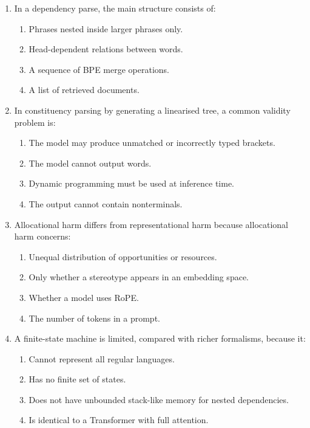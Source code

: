 \documentclass[11pt,a4paper]{article}
\begin{document}
\begin{enumerate}[leftmargin=*]
\begin{enumerate}
\item In a dependency parse, the main structure consists of:
\begin{enumerate}[label=\Alph*.]
\item Phrases nested inside larger phrases only.
\item Head-dependent relations between words.
\item A sequence of BPE merge operations.
\item A list of retrieved documents.
\end{enumerate}

\item In constituency parsing by generating a linearised tree, a common validity problem is:
\begin{enumerate}[label=\Alph*.]
\item The model may produce unmatched or incorrectly typed brackets.
\item The model cannot output words.
\item Dynamic programming must be used at inference time.
\item The output cannot contain nonterminals.
\end{enumerate}

\item Allocational harm differs from representational harm because allocational harm concerns:
\begin{enumerate}[label=\Alph*.]
\item Unequal distribution of opportunities or resources.
\item Only whether a stereotype appears in an embedding space.
\item Whether a model uses RoPE.
\item The number of tokens in a prompt.
\end{enumerate}

\item A finite-state machine is limited, compared with richer formalisms, because it:
\begin{enumerate}[label=\Alph*.]
\item Cannot represent all regular languages.
\item Has no finite set of states.
\item Does not have unbounded stack-like memory for nested dependencies.
\item Is identical to a Transformer with full attention.
\end{enumerate}
\end{enumerate}

\end{enumerate}
\end{document}
